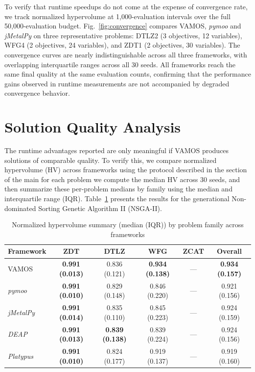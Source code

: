 \documentclass[final,5p,times,twocolumn]{elsarticle}
\newcommand{\VAMOS}{VAMOS}
\begin{document}
To verify that runtime speedups do not come at the expense of convergence rate, we track normalized hypervolume at 1{,}000-evaluation intervals over the full 50{,}000-evaluation budget. Fig.~\ref{fig:convergence} compares \VAMOS{}, \textit{pymoo}\revision{,} and \textit{jMetalPy} on three representative problems: DTLZ2 (3 objectives, 12 variables), WFG4 (2 objectives, 24 variables), and ZDT1 (2 objectives, 30 variables). The convergence curves are nearly indistinguishable across all three frameworks, with overlapping interquartile ranges across all 30 seeds. All frameworks reach the same final quality at the same evaluation counts, confirming that the performance gains observed in runtime measurements are not accompanied by degraded convergence behavior.


\section{Solution Quality Analysis}
\label{app:quality}
The runtime advantages reported  are only meaningful if \VAMOS{} produces solutions of comparable quality. To verify this, we compare normalized hypervolume (HV) across frameworks using the protocol described in the  section of the main  for each problem we compute the median HV across 30 seeds, and then summarize these per-problem medians by family using the median and interquartile range (IQR). Table~\ref{tab:frameworks_hv} presents the results for the generational Non-dominated Sorting Genetic Algorithm II (NSGA-II).

\begin{table}[htbp]
\centering
\caption{Normalized hypervolume summary (median (IQR)) by problem family across frameworks}
\label{tab:frameworks_hv}
\begin{tabular}{@{}lccccc@{}}
\toprule
\textbf{Framework} & \textbf{ZDT} & \textbf{DTLZ} & \textbf{WFG} & \textbf{ZCAT} & \textbf{Overall} \\
\midrule
VAMOS & \textbf{0.991 (0.013)} & 0.836 (0.121) & \textbf{0.934 (0.138)} & --- & \textbf{0.934 (0.157)} \\
\textit{pymoo} & \textbf{0.991 (0.010)} & 0.829 (0.148) & 0.846 (0.220) & --- & 0.921 (0.156) \\
\textit{jMetalPy} & \textbf{0.991 (0.014)} & 0.835 (0.110) & 0.845 (0.223) & --- & 0.924 (0.159) \\
\textit{DEAP} & \textbf{0.991 (0.013)} & \textbf{0.839 (0.138)} & 0.839 (0.224) & --- & 0.924 (0.156) \\
\textit{Platypus} & \textbf{0.991 (0.010)} & 0.824 (0.177) & 0.919 (0.137) & --- & 0.919 (0.160) \\
\bottomrule
\end{tabular}
\end{table}
\end{document}
